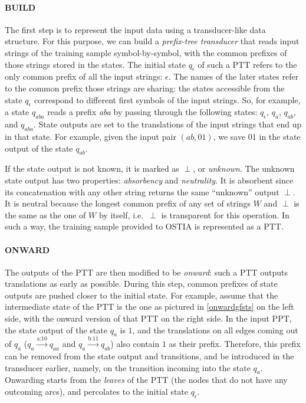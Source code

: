 \paragraph{BUILD}

The first step is to represent the input data using a transducer-like data structure.
For this purpose, we can build a \emph{prefix-tree transducer} that reads input strings of the training sample symbol-by-symbol, with the common prefixes of those strings stored in the states.
The initial state $q_\epsilon$ of such a PTT refers to the only common prefix of all the input strings: $\epsilon$.
The names of the later states refer to the common prefix those strings are sharing: the states accessible from the state $q_\epsilon$ correspond to different first symbols of the input strings.
So, for example, a state $q_{aba}$ reads a prefix \emph{aba} by passing through the following states: $q_\epsilon$, $q_{a}$, $q_{ab}$, and $q_{aba}$.
State outputs are set to the translations of the input strings that end up in that state.
For example, given the input pair $(ab, 01)$, we save $01$ in the state output of the state $q_{ab}$.

If the state output is not known, it is marked as $\perp$, or \emph{unknown}.
The unknown state output has two properties: \emph{absorbency} and \emph{neutrality}.
It is absorbent since its concatenation with any other string returns the same ``unknown'' output $\perp$.
It is neutral because the longest common prefix of any set of strings $W$ and $\perp$ is the same as the one of $W$ by itself, i.e.\  $\perp$ is transparent for this operation.
In such a way, the training sample provided to OSTIA is represented as a PTT.


\paragraph{ONWARD}

The outputs of the PTT are then modified to be \emph{onward}: such a PTT outputs translations as early as possible.
During this step, common prefixes of state outputs are pushed closer to the initial state.
For example, assume that the intermediate state of the PTT is the one as pictured in \ref{onwardgfsts} on the left side, with the onward version of that PTT on the right side.
In the input PPT, the state output of the state $q_a$ is $1$, and the translations on all edges coming out of $q_a$ ($q_a\xrightarrow{\text{a:10}}q_{aa}$ and $q_a\xrightarrow{\text{b:11}}q_{ab}$) also contain $1$ as their prefix.
Therefore, this prefix can be removed from the state output and transitions, and be introduced in the transducer earlier, namely, on the transition incoming into the state $q_a$.
Onwarding starts from the \emph{leaves} of the PTT (the nodes that do not have any outcoming arcs), and percolates to the initial state $q_\epsilon$.




